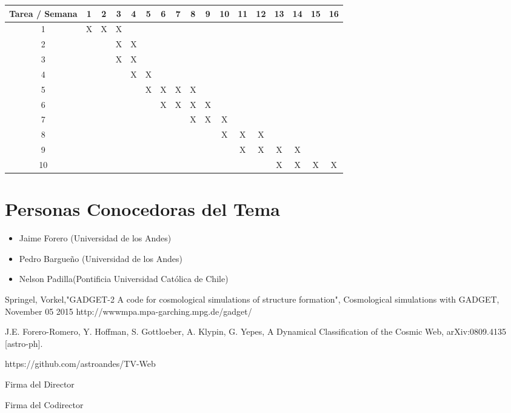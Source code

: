 \documentclass{article}
\begin{document}
\begin{table}[h]

\begin{tabular}{|c||c|c|c|c|c|c|c|c|c|c|c|c|c|c|c|c|}

\hline
Tarea / Semana & 1 & 2 & 3 & 4 & 5 & 6 & 7 & 8 & 9 & 10 & 11 & 12 & 13 & 14 & 15 & 16  \\
\hline\hline
1 & X & X & X &  &   &   &   &   &   &   &   &   &   &   &   &  \\
\hline
2 &   &  & X & X &  &   &   &   &   &   &   &   &   &   &   &  \\
\hline
3 &   &   &  X & X  & & &  &   &   &   &   &   &   &   &   &  \\
\hline
4 &   &   &   &  X & X  &  &  &  &   &   &   &   &   &   &   &  \\
\hline
5 &   &   &   &   & X  & X & X &  X &  &   &   &   &   &   &   &  \\
\hline
6 &   &   &   &   &   & X  & X & X &  X &   &   &   &   &   &   &  \\
\hline
7 &   &   &   &   &   &   &  & X & X & X &  &  &  &   &   &  \\
\hline
8 &   &   &   &   &   &   &   &   &   & X & X & X &  &   &   &  \\
\hline
9 &   &   &   &   &   &   &   &   &   &   & X  & X & X & X &  &  \\
\hline
10 &   &   &   &   &   &   &   &   &   &   &   &   & X & X & X & X\\
\hline



\end{tabular}

\end{table}

\section{Personas Conocedoras del Tema}

\begin{itemize}

\item Jaime Forero (Universidad de los Andes)
\item Pedro Bargueño (Universidad de los Andes)
\item Nelson Padilla(Pontificia Universidad Católica de Chile)

\end{itemize}


\begin{thebibliography}{9}

Springel, Vorkel,"GADGET-2 A code for cosmological simulations of structure formation", Cosmological simulations with GADGET, November 05 2015
http://wwwmpa.mpa-garching.mpg.de/gadget/

J.E. Forero-Romero, Y. Hoffman, S. Gottloeber, A. Klypin, G. Yepes, A Dynamical Classification of the Cosmic Web, arXiv:0809.4135 [astro-ph].

https://github.com/astroandes/TV-Web


\end{thebibliography}

Firma del Director


Firma del Codirector
\end{document}
